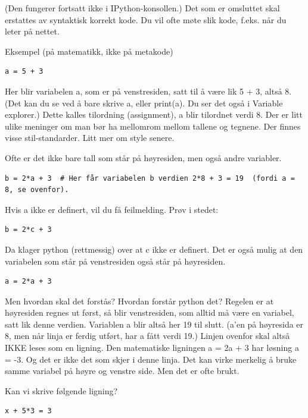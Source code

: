 {(Den fungerer fortsatt ikke i IPython-konsollen.) Det som er omsluttet skal erstattes av syntaktisk korrekt kode. Du vil ofte møte slik kode, f.eks. når du leter på nettet.

Eksempel (på matematikk, ikke på metakode)

\begin{lstlisting}
a = 5 + 3
\end{lstlisting}

Her blir variabelen a, som er på venstresiden, satt til å være lik 5 + 3, altså 8. (Det kan du se ved å bare skrive a, eller print(a). Du ser det også i Variable explorer.) Dette kalles tilordning (assignment), a blir tilordnet verdi 8. Der er litt ulike meninger om man bør ha mellomrom mellom tallene og tegnene. Der finnes visse stil-standarder. Litt mer om style senere. 

Ofte er det ikke bare tall som står på høyresiden, men også andre variabler. 

\begin{lstlisting}
b = 2*a + 3  # Her får variabelen b verdien 2*8 + 3 = 19  (fordi a = 8, se ovenfor).
\end{lstlisting}

Hvis a ikke er definert, vil du få feilmelding. Prøv i stedet: 

\begin{lstlisting}
b = 2*c + 3 
\end{lstlisting}

Da klager python (rettmessig) over at c ikke er definert. Det er også mulig at den variabelen som står på venstresiden også står på høyresiden.

\begin{lstlisting}
a = 2*a + 3
\end{lstlisting}

Men hvordan skal det forstås? Hvordan forstår python det? Regelen er at høyresiden regnes ut først, så blir venstresiden, som alltid må være en variabel, satt lik denne verdien. Variablen a blir altså her 19 til slutt. (a'en på høyresida er 8, men når linja er ferdig utført, har a fått verdi 19.) Linjen ovenfor skal altså IKKE leses som en ligning. Den matematiske ligningen a = 2a + 3 har løsning a = -3.
Og det er ikke det som skjer i denne linja. Det kan virke merkelig å bruke samme variabel på høyre og venstre side. Men det er ofte brukt. 

Kan vi skrive følgende ligning?

\begin{lstlisting}
x + 5*3 = 3
\end{lstlisting}

}
